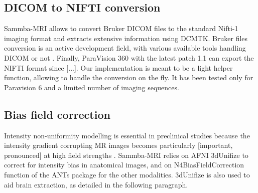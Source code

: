 \documentclass[utf8, a4paper, final, crop]{frontiersSCNS} %
\begin{document}
\subsection{DICOM to NIFTI conversion}

Sammba-MRI allows to convert Bruker DICOM files to the standard Nifti-1 
imaging format and extracts extensive information using DCMTK. 
Bruker files conversion is an active development field,
with various available tools handling DICOM \citeauthor{dicomifier} or
not \citeauthor{bru2nii, chavarrias2016bruker2nifti}.
Finally, ParaVision 360 with the latest patch 1.1 can export the NIFTI format since [...].
Our implementation is meant to be a light helper function, allowing to 
handle the conversion on the fly. It has been tested only for Paravision 6
and a limited number of imaging sequences.

\subsection{Bias field correction}

Intensity non-uniformity modelling is essential in preclinical studies
because the intensity gradient corrupting MR images becomes
particularly [important, pronounced] at high field strengths \citep{boyes2008intensity}.
Sammba-MRI relies on AFNI 3dUnifize to correct for intensity bias in
anatomical images, and on N4BiasFieldCorrection function
of the ANTs package \citep{tustison2010n4itk}
for the other modalities. 3dUnifize is also used to aid brain extraction,
as detailed in the following paragraph.

\end{document}
